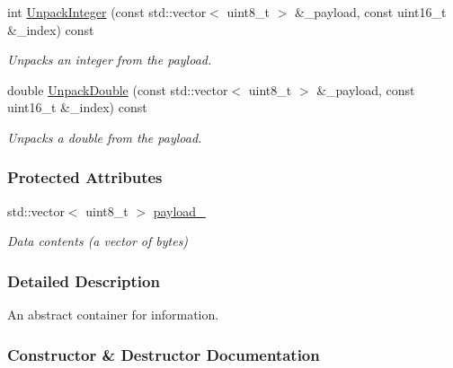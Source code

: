 \begin{DoxyCompactItemize}
int \hyperlink{classosse_1_1collaborate_1_1_packet_a7c786b41b594b51377b0a70ce3a61259}{Unpack\+Integer} (const std\+::vector$<$ uint8\+\_\+t $>$ \&\+\_\+payload, const uint16\+\_\+t \&\+\_\+index) const
\begin{DoxyCompactList}\small\item\em Unpacks an integer from the payload. \end{DoxyCompactList}\item 
double \hyperlink{classosse_1_1collaborate_1_1_packet_aa7678be22b45d54b28f1b85594638d60}{Unpack\+Double} (const std\+::vector$<$ uint8\+\_\+t $>$ \&\+\_\+payload, const uint16\+\_\+t \&\+\_\+index) const
\begin{DoxyCompactList}\small\item\em Unpacks a double from the payload. \end{DoxyCompactList}\end{DoxyCompactItemize}
\subsubsection*{Protected Attributes}
\begin{DoxyCompactItemize}
\item 
\mbox{\label{classosse_1_1collaborate_1_1_packet_a1917bbaba5a0fb4757947d2626287410}} 
std\+::vector$<$ uint8\+\_\+t $>$ \hyperlink{classosse_1_1collaborate_1_1_packet_a1917bbaba5a0fb4757947d2626287410}{payload\+\_\+}
\begin{DoxyCompactList}\small\item\em Data contents (a vector of bytes) \end{DoxyCompactList}\end{DoxyCompactItemize}


\subsubsection{Detailed Description}
An abstract container for information. 

\subsubsection{Constructor \& Destructor Documentation}
\mbox{\label{classosse_1_1collaborate_1_1_packet_a83e5d92a626c5adb0958c0faf7bbbf87}} 
